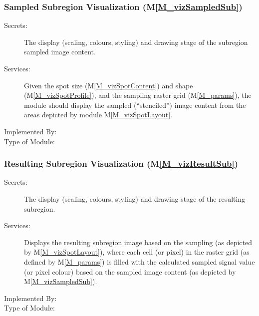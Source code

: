 \documentclass[12pt, titlepage]{article}
\newcommand{\mref}[1]{M\ref{#1}}
\begin{document}
\subsubsection{Sampled Subregion Visualization (\mref{M_vizSampledSub})}
\begin{description}
\item[Secrets:]The display (scaling, colours, styling) and drawing stage 
  of the subregion sampled image content.
\item[Services:]Given the spot size (\mref{M_vizSpotContent}) and
  shape (\mref{M_vizSpotProfile}), and the sampling raster grid (\mref{M_params}),
  the module should display the sampled (``stenciled'') image content from the areas
  depicted by module \mref{M_vizSpotLayout}.
\item[Implemented By:] \progname{}
\item[Type of Module:] 
\end{description}


\subsubsection{Resulting Subregion Visualization (\mref{M_vizResultSub})}
\begin{description}
\item[Secrets:]The display (scaling, colours, styling) and drawing stage 
  of the resulting subregion.
\item[Services:]Displays the resulting subregion image based on the sampling
  (as depicted by \mref{M_vizSpotLayout}),
  where each cell (or pixel) in the raster grid (as defined by \mref{M_params})
  is filled with the calculated sampled signal value (or pixel colour) based
  on the sampled image content (as depicted by \mref{M_vizSampledSub}).
\item[Implemented By:] \progname{}
\item[Type of Module:] 
\end{description}
\end{document}
